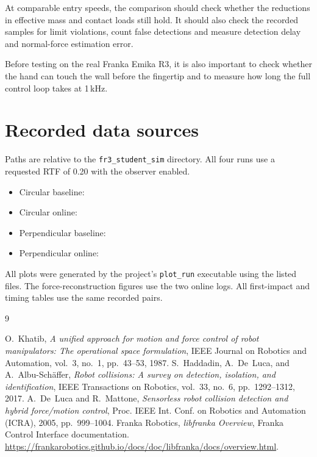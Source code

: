 \documentclass[11pt,a4paper]{article}
\begin{document}
At comparable entry speeds, the comparison should check whether the
reductions in effective mass and contact loads still hold. It should
also check the recorded samples for limit violations, count false
detections and measure detection delay and normal-force estimation error.

Before testing on the real Franka Emika R3, it is also important to check
whether the hand can touch the wall before the fingertip and to measure
how long the full control loop takes at 1\,kHz.

\clearpage
\appendix
\section{Recorded data sources}
\label{app:sources}
Paths are relative to the \texttt{fr3\_student\_sim} directory. All four
runs use a requested RTF of 0.20 with the observer enabled.

\begin{itemize}
\item Circular baseline:
\item Circular online:
\item Perpendicular baseline:
\item Perpendicular online:
\end{itemize}
All plots were generated by the project's
\texttt{plot\_run} executable using the listed files. The force-reconstruction
figures use the two online logs. All first-impact and timing tables use the
same recorded pairs.

\clearpage

\begin{thebibliography}{9}
{}
O.~Khatib, \emph{A unified approach for motion and force control of robot
manipulators: The operational space formulation}, IEEE Journal
on Robotics and Automation, vol.~3, no.~1, pp.~43--53, 1987.
S.~Haddadin, A.~De~Luca, and A.~Albu-Sch\"affer, \emph{Robot collisions:
A survey on detection, isolation, and identification}, IEEE
Transactions on Robotics, vol.~33, no.~6, pp.~1292--1312, 2017.
A.~De~Luca and R.~Mattone, \emph{Sensorless robot collision detection and
hybrid force/motion control}, Proc. IEEE Int. Conf. on Robotics
and Automation (ICRA), 2005, pp.~999--1004.
Franka Robotics, \emph{libfranka Overview}, Franka Control Interface
documentation. \url{https://frankarobotics.github.io/docs/doc/libfranka/docs/overview.html}.
\end{thebibliography}
\end{document}
